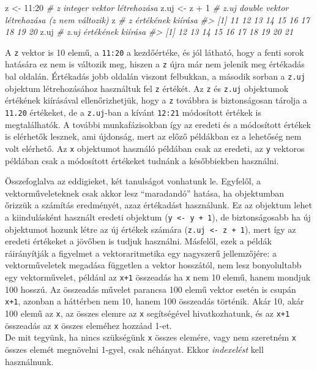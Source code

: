 \documentclass[
]{book}
\newenvironment{Shaded}{\begin{snugshade}}{\end{snugshade}}
\newcommand{\CommentTok}[1]{\textcolor[rgb]{0.56,0.35,0.01}{\textit{#1}}}
\newcommand{\DecValTok}[1]{\textcolor[rgb]{0.00,0.00,0.81}{#1}}
\newcommand{\NormalTok}[1]{#1}
\newcommand{\OtherTok}[1]{\textcolor[rgb]{0.56,0.35,0.01}{#1}}
\newcommand{\SpecialCharTok}[1]{\textcolor[rgb]{0.00,0.00,0.00}{#1}}
\begin{document}
\begin{Shaded}
\begin{Highlighting}[]
\NormalTok{z    }\OtherTok{\textless{}{-}} \DecValTok{11}\SpecialCharTok{:}\DecValTok{20}         \CommentTok{\# z integer vektor létrehozása}
\NormalTok{z.uj }\OtherTok{\textless{}{-}}\NormalTok{ z }\SpecialCharTok{+} \DecValTok{1}         \CommentTok{\# z.uj double vektor létrehozása (z nem változik)}
\NormalTok{z                     }\CommentTok{\# z értékének kiírása}
\CommentTok{\#\textgreater{}  [1] 11 12 13 14 15 16 17 18 19 20}
\NormalTok{z.uj                  }\CommentTok{\# z.uj értékének kiírása}
\CommentTok{\#\textgreater{}  [1] 12 13 14 15 16 17 18 19 20 21}
\end{Highlighting}
\end{Shaded}

A \texttt{z} vektor is 10 elemű, a \texttt{11:20} a kezdőértéke, és jól látható, hogy a fenti sorok hatására ez nem is változik meg, hiszen a \texttt{z} újra már nem jelenik meg értékadás bal oldalán. Értékadás jobb oldalán viszont felbukkan, a második sorban a \texttt{z.uj} objektum létrehozásához használtuk fel \texttt{z} értékét. Az \texttt{z} és \texttt{z.uj} objektumok értékének kiírásával ellenőrizhetjük, hogy a \texttt{z} továbbra is biztonságosan tárolja a \texttt{11.20} értékeket, de a \texttt{z.uj}-ban a kívánt \texttt{12:21} módosított értékek is megtalálhatók. A további munkafázisokban így az eredeti és a módosított értékek is elérhetők lesznek, ami újdonság, mert az előző példákban ez a lehetőség nem volt elérhető. Az \texttt{x} objektumot használó példában csak az eredeti, az \texttt{y} vektoros példában csak a módosított értékeket tudnánk a későbbiekben használni.

Összefoglalva az eddigieket, két tanulságot vonhatunk le. Egyfelől, a vektorműveleteknek csak akkor lesz ``maradandó'' hatása, ha objektumban őrizzük a számítás eredményét, azaz értékadást használunk. Ez az objektum lehet a kiindulásként használt eredeti objektum (\texttt{y\ \textless{}-\ y\ +\ 1}), de biztonságosabb ha új objektumot hozunk létre az új értékek számára (\texttt{z.uj\ \textless{}-\ z\ +\ 1}), mert így az eredeti értékeket a jövőben is tudjuk használni. Másfelől, ezek a példák ráirányítják a figyelmet a vektoraritmetika egy nagyszerű jellemzőjére: a vektorműveletek megadása független a vektor hosszától, nem lesz bonyolultabb egy vektorművelet, például az \texttt{x+1} összeadás ha \texttt{x} nem 10 elemű, hanem mondjuk 100 hosszú. Az összeadás művelet parancsa 100 elemű vektor esetén is csupán \texttt{x+1}, azonban a háttérben nem 10, hanem 100 összeadás történik. Akár 10, akár 100 elemű az \texttt{x}, az összes elemre az \texttt{x} segítségével hivatkozhatunk, és az \texttt{x+1} összeadás az \texttt{x} összes eleméhez hozzáad 1-et.\\
De mit tegyünk, ha nincs szükségünk \texttt{x} összes elemére, vagy nem szeretném \texttt{x} összes elemét megnövelni 1-gyel, csak néhányat. Ekkor \emph{indexelést} kell használnunk.
\end{document}
